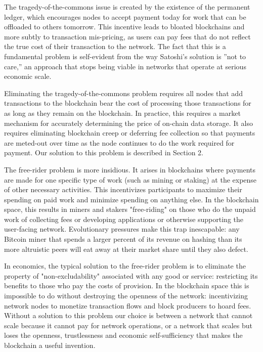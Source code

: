 \documentclass[11pt, oneside]{article}   	%
\begin{document}
\begin{multicols}{2}
The tragedy-of-the-commons issue is created by the existence of the permanent ledger, which encourages nodes to accept payment today for work that can be offloaded to others tomorrow.  This incentive leads to bloated blockchains and more subtly to transaction mis-pricing, as users can pay fees that do not reflect the true cost of their transaction to the network. The fact that this is a fundamental problem is self-evident from the way Satoshi’s solution is ”not to care,” an approach that stops being viable in networks that operate at serious economic scale.

Eliminating the tragedy-of-the-commons problem requires all nodes that add transactions to the blockchain bear the cost of processing those transactions for as long as they remain on the blockchain. In practice, this requires a market mechanism for accurately determining the price of on-chain data storage. It also requires eliminating blockchain creep or deferring fee collection so that payments are meted-out over time as the node continues to do the work required for payment. Our solution to this problem is described in Section 2.

The free-rider problem is more insidious. It arises in blockchains where payments are made for one specific type of work (such as mining or staking) at the expense of other necessary activities. This incentivizes participants to maximize their spending on paid work and minimize spending on anything else. In the blockchain space, this results in miners and stakers "free-riding" on those who do the unpaid work of collecting fees or developing applications or otherwise supporting the user-facing network. Evolutionary pressures make this trap inescapable: any Bitcoin miner that spends a larger percent of its revenue on hashing than its more altruistic peers will eat away at their market share until they also defect.

In economics, the typical solution to the free-rider problem is to eliminate the property of "non-excludability" associated with any good or service: restricting its benefits to those who pay the costs of provision. In the blockchain space this is impossible to do without destroying the openness of the network: incentivizing network nodes to monetize transaction flows and block producers to hoard fees. Without a solution to this problem our choice is between a network that cannot scale because it cannot pay for network operations, or a network that scales but loses the openness, trustlessness and economic self-sufficiency that makes the blockchain a useful invention.


\end{multicols}
\end{document}
